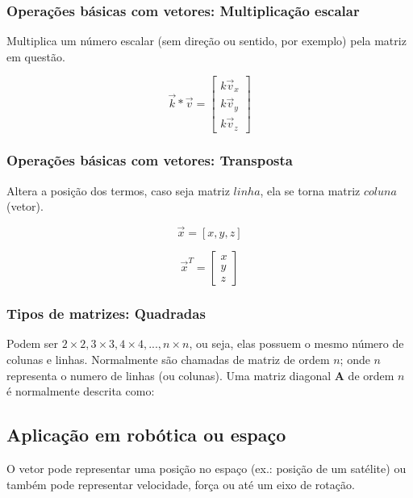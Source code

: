 \subsubsection{Operações básicas com vetores: Multiplicação escalar}
Multiplica um número escalar (sem direção ou sentido, por exemplo) pela matriz em questão.

\begin{equation}
\label{eq:multiplicacao_escalar}
    \vec k * \vec v = 
    \begin{bmatrix}
    k\vec v_x \\
    k\vec v_y \\
    k\vec v_z
    \end{bmatrix}
\end{equation}

\subsubsection{Operações básicas com vetores: Transposta}
Altera a posição dos termos, caso seja matriz $linha$, ela se torna matriz $coluna$ (vetor).

\begin{equation}
\label{eq:transposta_linha2coluna1}
    \vec x = 
    [x,y,z]
\end{equation}

\begin{equation}
\label{eq:transposta_linha2coluna2}
    \vec x^T =
    \begin{bmatrix}
    x \\
    y \\
    z
    \end{bmatrix} 
\end{equation}

\subsubsection{Tipos de matrizes: Quadradas}
Podem ser $2\times2, 3\times3, 4\times4, ..., n\times n$, ou seja, elas possuem o mesmo número de colunas e linhas. Normalmente são chamadas de matriz de ordem $n$; onde $n$ representa o numero de linhas (ou colunas). Uma matriz diagonal \textbf{A} de ordem $n$ é normalmente descrita como:


\subsection{Aplicação em robótica ou espaço}
O vetor pode representar uma posição no espaço (ex.: posição de um satélite) ou também pode representar velocidade, força ou até um eixo de rotação.

